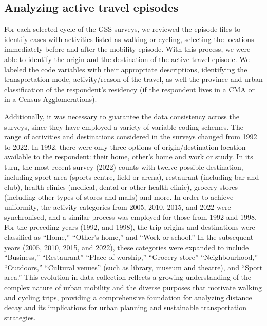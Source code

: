 \documentclass[preprint, 3p,
authoryear]{elsarticle} %
\begin{document}
\subsection{Analyzing active travel
episodes}\label{analyzing-active-travel-episodes}

For each selected cycle of the GSS surveys, we reviewed the episode
files to identify cases with activities listed as walking or cycling,
selecting the locations immediately before and after the mobility
episode. With this process, we were able to identify the origin and the
destination of the active travel episode. We labeled the code variables
with their appropriate descriptions, identifying the transportation
mode, activity/reason of the travel, as well the province and urban
classification of the respondent's residency (if the respondent lives in
a CMA or in a Census Agglomerations).

Additionally, it was necessary to guarantee the data consistency across
the surveys, since they have employed a variety of variable coding
schemes. The range of activities and destinations considered in the
surveys changed from 1992 to 2022. In 1992, there were only three
options of origin/destination location available to the respondent:
their home, other's home and work or study. In its turn, the most recent
survey (2022) counts with twelve possible destination, including sport
area (sports centre, field or arena), restaurant (including bar and
club), health clinics (medical, dental or other health clinic), grocery
stores (including other types of stores and malls) and more. In order to
achieve uniformity, the activity categories from 2005, 2010, 2015, and
2022 were synchronised, and a similar process was employed for those
from 1992 and 1998. For the preceding years (1992, and 1998), the trip
origins and destinations were classified as ``Home,'' ``Other's home,''
and ``Work or school.'' In the subsequent years (2005, 2010, 2015, and
2022), these categories were expanded to include ``Business,''
``Restaurant'' ``Place of worship,'' ``Grocery store''
``Neighbourhood,'' ``Outdoors,'' ``Cultural venues'' (such as library,
museum and theatre), and ``Sport area.'' This evolution in data
collection reflects a growing understanding of the complex nature of
urban mobility and the diverse purposes that motivate walking and
cycling trips, providing a comprehensive foundation for analyzing
distance decay and its implications for urban planning and sustainable
transportation strategies.
\end{document}
